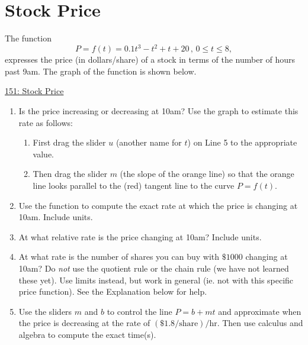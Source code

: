 \documentclass{ximera}
\begin{document}
\section{Stock Price}

\begin{question}  \label{Qkkdgkk44437777}
The function
\[
      P = f(t) = 0.1t^3-t^2+t+20 \, , \, 0\leq t \leq 8 ,
\]
expresses the price (in dollars/share) of a stock in terms of the number of hours past 9am. The graph of the function is shown below.

\begin{onlineOnly}
    \begin{center}
\end{center}
\end{onlineOnly}

\href{https://www.desmos.com/calculator/gpqicgxvk3}{151: Stock Price}

\begin{enumerate}
\item Is the price increasing or decreasing at 10am? Use the graph to estimate this rate as follows:

\begin{enumerate}
\item First drag the slider $u$ (another name for $t$) on Line 5 to the appropriate value.

\item Then drag the slider $m$ (the slope of the orange line) so that the orange line looks parallel to the (red) tangent line to the curve $P=f(t)$.
\end{enumerate}


\item Use the function to compute the exact rate at which the price is changing at 10am. Include units.

\item At what relative rate is the price changing at 10am? Include units.

\item At what rate is the number of shares you can buy with $\$1000$ changing at 10am? Do \emph{not} use the quotient rule or the chain rule (we have not learned these yet). Use limits instead, but work in general (ie. not with this specific price function).
See the Explanation below for help.

\item Use the sliders $m$ and $b$ to control the line $P=b+mt$ and approximate when the price is decreasing at the rate of $(\$1.8/\text{share})/\text{hr}$. Then use calculus and algebra to compute the exact time(s).


\end{enumerate}
\end{question}
\end{document}
